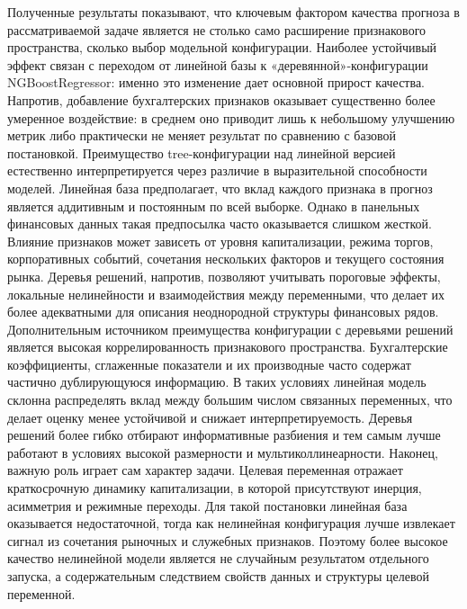 \documentclass[
]{article}
\begin{document}
Полученные результаты показывают, что ключевым фактором качества прогноза в рассматриваемой задаче является не столько само расширение признакового пространства, сколько выбор модельной конфигурации. Наиболее устойчивый эффект связан с переходом от линейной базы к «деревянной»-конфигурации NGBoostRegressor: именно это изменение дает основной прирост качества. Напротив, добавление бухгалтерских признаков оказывает существенно более умеренное воздействие: в среднем оно приводит лишь к небольшому улучшению метрик либо практически не меняет результат по сравнению с базовой постановкой. Преимущество tree-конфигурации над линейной версией естественно интерпретируется через различие в выразительной способности моделей. Линейная база предполагает, что вклад каждого признака в прогноз является аддитивным и постоянным по всей выборке. Однако в панельных финансовых данных такая предпосылка часто оказывается слишком жесткой. Влияние признаков может зависеть от уровня капитализации, режима торгов, корпоративных событий, сочетания нескольких факторов и текущего состояния рынка. Деревья решений, напротив, позволяют учитывать пороговые эффекты, локальные нелинейности и взаимодействия между переменными, что делает их более адекватными для описания неоднородной структуры финансовых рядов. Дополнительным источником преимущества конфигурации с деревьями решений является высокая коррелированность признакового пространства. Бухгалтерские коэффициенты, сглаженные показатели и их производные часто содержат частично дублирующуюся информацию. В таких условиях линейная модель склонна распределять вклад между большим числом связанных переменных, что делает оценку менее устойчивой и снижает интерпретируемость. Деревья решений более гибко отбирают информативные разбиения и тем самым лучше работают в условиях высокой размерности и мультиколлинеарности. Наконец, важную роль играет сам характер задачи. Целевая переменная отражает краткосрочную динамику капитализации, в которой присутствуют инерция, асимметрия и режимные переходы. Для такой постановки линейная база оказывается недостаточной, тогда как нелинейная конфигурация лучше извлекает сигнал из сочетания рыночных и служебных признаков. Поэтому более высокое качество нелинейной модели является не случайным результатом отдельного запуска, а содержательным следствием свойств данных и структуры целевой переменной.
\end{document}
